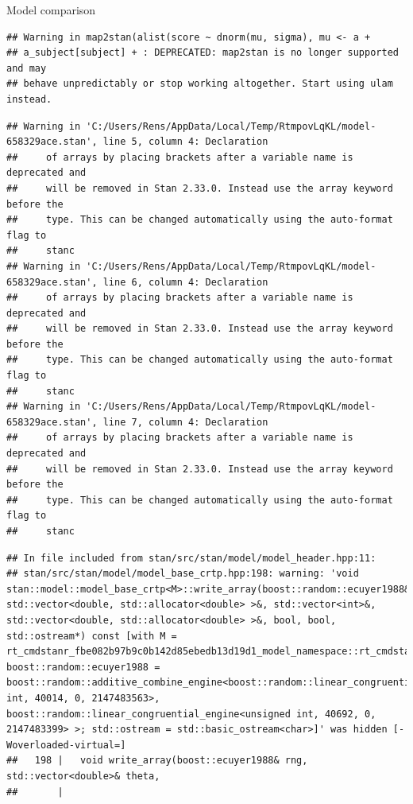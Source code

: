 \documentclass[
  ignorenonframetext,
]{beamer}
\begin{document}
\begin{frame}[fragile]{Model comparison}
\begin{verbatim}
## Warning in map2stan(alist(score ~ dnorm(mu, sigma), mu <- a +
## a_subject[subject] + : DEPRECATED: map2stan is no longer supported and may
## behave unpredictably or stop working altogether. Start using ulam instead.
\end{verbatim}

\begin{verbatim}
## Warning in 'C:/Users/Rens/AppData/Local/Temp/RtmpovLqKL/model-658329ace.stan', line 5, column 4: Declaration
##     of arrays by placing brackets after a variable name is deprecated and
##     will be removed in Stan 2.33.0. Instead use the array keyword before the
##     type. This can be changed automatically using the auto-format flag to
##     stanc
## Warning in 'C:/Users/Rens/AppData/Local/Temp/RtmpovLqKL/model-658329ace.stan', line 6, column 4: Declaration
##     of arrays by placing brackets after a variable name is deprecated and
##     will be removed in Stan 2.33.0. Instead use the array keyword before the
##     type. This can be changed automatically using the auto-format flag to
##     stanc
## Warning in 'C:/Users/Rens/AppData/Local/Temp/RtmpovLqKL/model-658329ace.stan', line 7, column 4: Declaration
##     of arrays by placing brackets after a variable name is deprecated and
##     will be removed in Stan 2.33.0. Instead use the array keyword before the
##     type. This can be changed automatically using the auto-format flag to
##     stanc
\end{verbatim}

\begin{verbatim}
## In file included from stan/src/stan/model/model_header.hpp:11:
## stan/src/stan/model/model_base_crtp.hpp:198: warning: 'void stan::model::model_base_crtp<M>::write_array(boost::random::ecuyer1988&, std::vector<double, std::allocator<double> >&, std::vector<int>&, std::vector<double, std::allocator<double> >&, bool, bool, std::ostream*) const [with M = rt_cmdstanr_fbe082b97b9c0b142d85ebedb13d19d1_model_namespace::rt_cmdstanr_fbe082b97b9c0b142d85ebedb13d19d1_model; boost::random::ecuyer1988 = boost::random::additive_combine_engine<boost::random::linear_congruential_engine<unsigned int, 40014, 0, 2147483563>, boost::random::linear_congruential_engine<unsigned int, 40692, 0, 2147483399> >; std::ostream = std::basic_ostream<char>]' was hidden [-Woverloaded-virtual=]
##   198 |   void write_array(boost::ecuyer1988& rng, std::vector<double>& theta,
##       |
\end{verbatim}


\end{frame}
\end{document}
